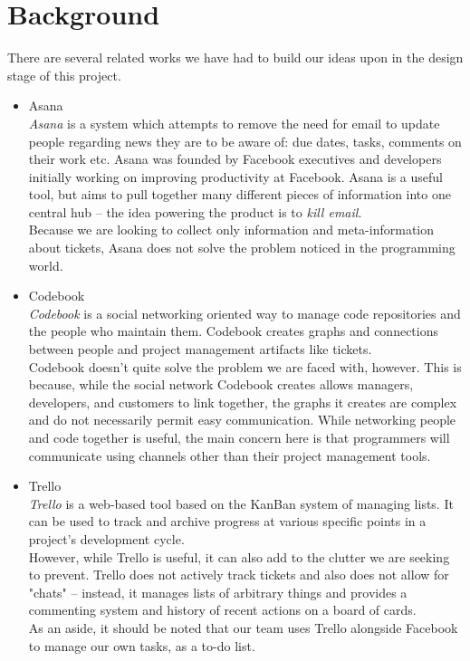 \documentclass[10pt]{article}
\begin{document}
\section{Background}
There are several related works we have had to build our ideas upon in the design stage of this project. 
\begin{itemize}
\item Asana\\
	\emph{Asana} is a system which attempts to remove the need for email to update people regarding news they are to be aware of: due dates, tasks, comments on their work etc. Asana was founded by Facebook executives and developers initially working on improving productivity at Facebook. Asana is a useful tool, but aims to pull together many different pieces of information into one central hub -- the idea powering the product is to \emph{kill email}. \\
Because we are looking to collect only information and meta-information about tickets, Asana does not solve the problem noticed in the programming world. 
\item Codebook \\
	\emph{Codebook} is a social networking oriented way to manage code repositories and the people who maintain them. Codebook creates graphs and connections between people and project management artifacts like tickets.\\
Codebook doesn't quite solve the problem we are faced with, however. This is because, while the social network Codebook creates allows managers, developers, and customers to link together, the graphs it creates are complex and do not necessarily permit easy communication. While networking people and code together is useful, the main concern here is that programmers will communicate using channels other than their project management tools. 
\item Trello \\
	\emph{Trello} is a web-based tool based on the KanBan system of managing lists. It can be used to track and archive progress at various specific points in a project's development cycle. \\
However, while Trello is useful, it can also add to the clutter we are seeking to prevent. Trello does not actively track tickets and also does not allow for "chats" -- instead, it manages lists of arbitrary things and provides a commenting system and history of recent actions on a board of cards. \\
As an aside, it should be noted that our team uses Trello alongside Facebook to manage our own tasks, as a to-do list. 

\end{itemize}
\end{document}
